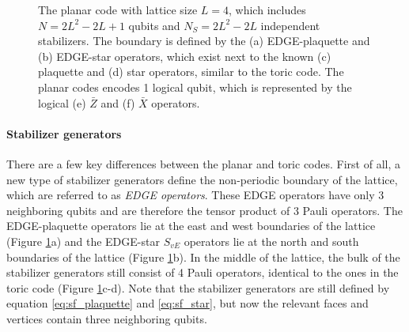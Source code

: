 \begin{figure}[h]
  \centering


  \caption{The planar code with lattice size $L=4$, which includes $N = 2L^2-2L+1$ qubits and $N_S = 2L^2-2L$ independent stabilizers. The boundary is defined by the (a) EDGE-plaquette and (b) EDGE-star operators, which exist next to the known (c) plaquette and (d) star operators, similar to the toric code. The planar codes encodes 1 logical qubit, which is represented by the logical (e) $\bar{Z}$ and (f) $\bar{X}$ operators.}\label{sf:fig_planar}
\end{figure}

\paragraph{Stabilizer generators}
There are a few key differences between the planar and toric codes. First of all, a new type of stabilizer generators define the non-periodic boundary of the lattice, which are referred to as \emph{EDGE operators}. These EDGE operators have only 3 neighboring qubits and are therefore the tensor product of 3 Pauli operators. The EDGE-plaquette operators lie at the east and west boundaries of the lattice (Figure \ref{sf:fig_planar}a) and the EDGE-star $S_{vE}$ operators lie at the north and south boundaries of the lattice (Figure \ref{sf:fig_planar}b). In the middle of the lattice, the bulk of the stabilizer generators still consist of 4 Pauli operators, identical to the ones in the toric code (Figure \ref{sf:fig_planar}c-d). Note that the stabilizer generators are still defined by equation \ref{eq:sf_plaquette} and \ref{eq:sf_star}, but now the relevant faces and vertices contain three neighboring qubits.

